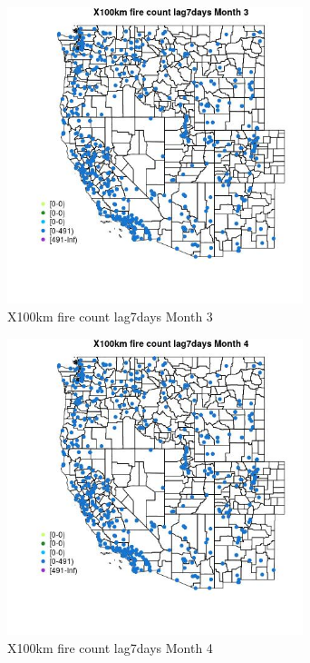 \begin{figure} 
\centering  
\includegraphics[width=0.77\textwidth]{Code_Outputs/Report_ML_input_PM25_Step4_part_e_de_duplicated_aves_compiled_2019-05-14wNAs_MapObsMo3X100km_fire_count_lag7days.jpg} 
\caption{\label{fig:Report_ML_input_PM25_Step4_part_e_de_duplicated_aves_compiled_2019-05-14wNAsMapObsMo3X100km_fire_count_lag7days}X100km fire count lag7days Month 3} 
\end{figure} 
 

\begin{figure} 
\centering  
\includegraphics[width=0.77\textwidth]{Code_Outputs/Report_ML_input_PM25_Step4_part_e_de_duplicated_aves_compiled_2019-05-14wNAs_MapObsMo4X100km_fire_count_lag7days.jpg} 
\caption{\label{fig:Report_ML_input_PM25_Step4_part_e_de_duplicated_aves_compiled_2019-05-14wNAsMapObsMo4X100km_fire_count_lag7days}X100km fire count lag7days Month 4} 
\end{figure} 
 

